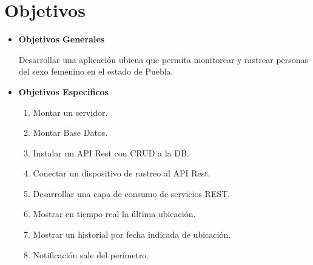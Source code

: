 \chapter{Objetivos}

\begin{itemize}
\item \textbf{Objetivos Generales}\itemsep2pt\\
\begin{description}
Desarrollar una aplicación ubicua que permita monitorear y rastrear personas del sexo femenino en el estado de Puebla.
\end{description}
\item \textbf{Objetivos Especificos}\itemsep2pt\\
\begin{enumerate}
\item Montar un servidor.
\item Montar Base Datos.
\item Instalar un API Rest con CRUD a la DB.
\item Conectar un dispositivo de rastreo al API Rest.
\item Desarrollar una capa de consumo de servicios REST.
\item Mostrar en tiempo real la última ubicación.
\item Mostrar un historial por fecha indicada de ubicación.
\item Notificación sale del perímetro.
\end{enumerate}
\end{itemize}





